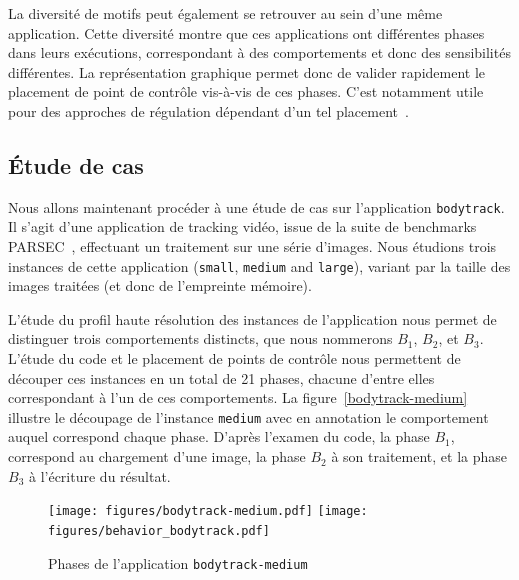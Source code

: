
La diversité de motifs peut également se retrouver au sein d'une même application.
Cette diversité montre que ces applications ont différentes phases dans leurs exécutions, correspondant à des comportements et donc des sensibilités différentes.
La représentation graphique permet donc de valider rapidement le placement de point de contrôle vis-à-vis de ces phases.
C'est notamment utile pour des approches de régulation dépendant d'un tel placement~\cite{kritikakou2014run}.

\subsection{Étude de cas}

Nous allons maintenant procéder à une étude de cas sur l'application \texttt{bodytrack}.
Il s'agit d'une application de tracking vidéo, issue de la suite de benchmarks \textsc{PARSEC}~\cite{bienia2008parsec}, effectuant un traitement sur une série d'images.
Nous étudions trois instances de cette application (\texttt{small}, \texttt{medium} and \texttt{large}), variant par la taille des images traitées (et donc de l'empreinte mémoire).

L'étude du profil haute résolution des instances de l'application nous permet de distinguer trois comportements distincts, que nous nommerons $B_1$, $B_2$, et $B_3$.
L'étude du code et le placement de points de contrôle nous permettent de découper ces instances en un total de 21 phases, chacune d'entre elles correspondant à l'un de ces comportements.
La figure~\ref{bodytrack-medium} illustre le découpage de l'instance \texttt{medium} avec en annotation le comportement auquel correspond chaque phase.
D'après l'examen du code, la phase $B_1$, correspond au chargement d'une image, la phase $B_2$ à son traitement, et la phase $B_3$ à l'écriture du résultat.

\begin{figure}
	\centering
  	\texttt{[image: figures/bodytrack-medium.pdf]}%
		\hspace*{-\linewidth}%
	\texttt{[image: figures/behavior\_bodytrack.pdf]}
	\caption{\label{fig:case-study-bodytrack-medium}Phases de l'application \texttt{bodytrack-medium}}
\end{figure}

